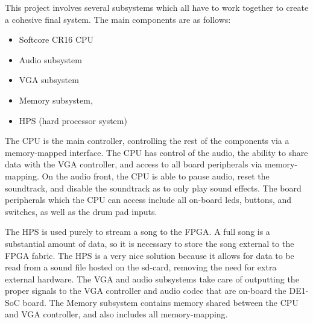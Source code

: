 \documentclass{subfile}
\begin{document}
  This project involves several subsystems which all have to work together to create a 
  cohesive final system. 
  The main components are as follows: 
  \begin{itemize} 
  \item Softcore CR16 CPU 
  \item Audio subsystem 
  \item VGA subsystem 
  \item Memory subsystem, 
  \item HPS (hard processor system)
  \end{itemize}

  The CPU is the main controller, controlling the rest of the components via a memory-mapped interface. 
  The CPU has control of the audio, the ability to share data with the VGA controller, and access 
  to all board peripherals via memory-mapping.
  On the audio front, the CPU is able to pause audio, reset the soundtrack, and disable the 
  soundtrack as to only play sound effects.
  The board peripherals which the CPU can access include all on-board leds, buttons, and switches, 
  as well as the drum pad inputs.

  The HPS is used purely to stream a song to the FPGA. 
  A full song is a substantial amount of data, so it is necessary to store the song external to 
  the FPGA fabric. 
  The HPS is a very nice solution because it allows for data to be read from a sound file hosted 
  on the sd-card, removing the need for extra external hardware.
  The VGA and audio subsystems take care of outputting the proper signals to the VGA 
  controller and audio codec that are on-board the DE1-SoC board.
  The Memory subsystem contains memory shared between the CPU and VGA controller, and 
  also includes all memory-mapping.
\end{document}
